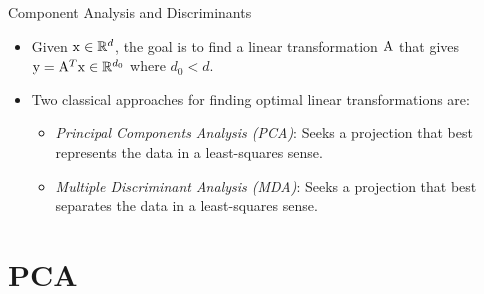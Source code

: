 
\begin{frame}{Component Analysis and Discriminants}
\begin{itemize}
\setlength{\itemsep}{12pt}
\item Given ${\rm x}\in \mathbb{R}^d$, the goal is to find a linear transformation ${\rm A}$ that gives ${\rm y} = {\rm A}^T{\rm x} \in \mathbb{R}^{d_0}$ where $d_0 < d$.
\item Two classical approaches for finding optimal linear
transformations are:
\begin{itemize}
\setlength{\itemsep}{8pt}
\item \textit{\color{mycolor2}Principal Components Analysis (PCA)}: Seeks a projection that best represents the data in a least-squares sense.
\item \textit{\color{mycolor2}Multiple Discriminant Analysis (MDA)}: Seeks a projection that
best separates the data in a least-squares sense.
\end{itemize}
\end{itemize}
\end{frame}

\section{PCA}
\subsection{}

